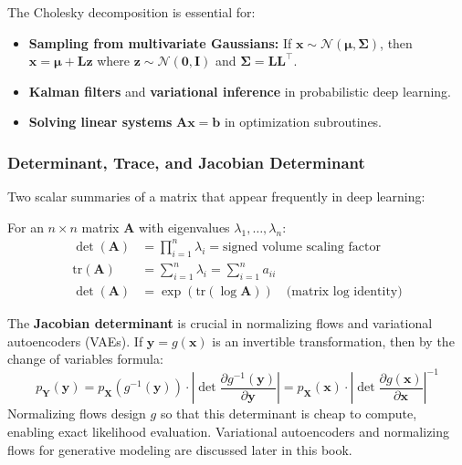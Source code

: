 The Cholesky decomposition is essential for:
\begin{itemize}
    \item \textbf{Sampling from multivariate Gaussians:} If $\mathbf{x} \sim \mathcal{N}(\boldsymbol{\mu}, \boldsymbol{\Sigma})$, then $\mathbf{x} = \boldsymbol{\mu} + \mathbf{L}\mathbf{z}$ where $\mathbf{z} \sim \mathcal{N}(\mathbf{0}, \mathbf{I})$ and $\boldsymbol{\Sigma} = \mathbf{L}\mathbf{L}^\top$.
    \item \textbf{Kalman filters} and \textbf{variational inference} in probabilistic deep learning.
    \item \textbf{Solving linear systems} $\mathbf{A}\mathbf{x} = \mathbf{b}$ in optimization subroutines.
\end{itemize}

\subsubsection{Determinant, Trace, and Jacobian Determinant}

Two scalar summaries of a matrix that appear frequently in deep learning:

\begin{property}
For an $n \times n$ matrix $\mathbf{A}$ with eigenvalues $\lambda_1, \ldots, \lambda_n$:
\begin{align}
\det(\mathbf{A}) &= \prod_{i=1}^{n} \lambda_i = \text{signed volume scaling factor} \\
\text{tr}(\mathbf{A}) &= \sum_{i=1}^{n} \lambda_i = \sum_{i=1}^{n} a_{ii} \\
\det(\mathbf{A}) &= \exp(\text{tr}(\log \mathbf{A})) \quad \text{(matrix log identity)}
\end{align}
\end{property}

The \textbf{Jacobian determinant} is crucial in normalizing flows and variational autoencoders (VAEs). If $\mathbf{y} = g(\mathbf{x})$ is an invertible transformation, then by the change of variables formula:
\begin{equation}
p_{\mathbf{Y}}(\mathbf{y}) = p_{\mathbf{X}}(g^{-1}(\mathbf{y})) \cdot \left|\det \frac{\partial g^{-1}(\mathbf{y})}{\partial \mathbf{y}}\right| = p_{\mathbf{X}}(\mathbf{x}) \cdot \left|\det \frac{\partial g(\mathbf{x})}{\partial \mathbf{x}}\right|^{-1}
\end{equation}
Normalizing flows design $g$ so that this determinant is cheap to compute, enabling exact likelihood evaluation. Variational autoencoders and normalizing flows for generative modeling are discussed later in this book.

